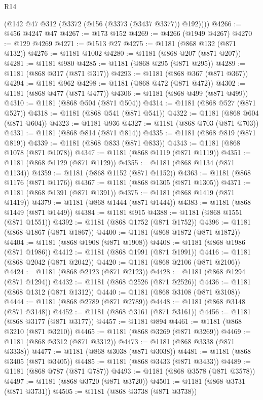 \begin{lexlean}{R14}
\begin{coremodule}
      (@142 @47 @312 (@3372 (@156 (@3373 (@3437 @3377)) @192))))
@4266 := @456 @4247 @47
@4267 := @173 @152
@4269 := @4266 (@1949 @4267)
@4270 := @129 @4269
@4271 := @1513 @27
@4275 := @1181 (@868 @132 (@871 @132))
@4276 := @1181 @1002
@4280 := @1181 (@868 @207 (@871 @207))
@4281 := @1181 @980
@4285 := @1181 (@868 @295 (@871 @295))
@4289 := @1181 (@868 @317 (@871 @317))
@4293 := @1181 (@868 @367 (@871 @367))
@4294 := @1181 @962
@4298 := @1181 (@868 @472 (@871 @472))
@4302 := @1181 (@868 @477 (@871 @477))
@4306 := @1181 (@868 @499 (@871 @499))
@4310 := @1181 (@868 @504 (@871 @504))
@4314 := @1181 (@868 @527 (@871 @527))
@4318 := @1181 (@868 @541 (@871 @541))
@4322 := @1181 (@868 @604 (@871 @604))
@4323 := @1181 @936
@4327 := @1181 (@868 @703 (@871 @703))
@4331 := @1181 (@868 @814 (@871 @814))
@4335 := @1181 (@868 @819 (@871 @819))
@4339 := @1181 (@868 @833 (@871 @833))
@4343 := @1181 (@868 @1078 (@871 @1078))
@4347 := @1181 (@868 @1119 (@871 @1119))
@4351 := @1181 (@868 @1129 (@871 @1129))
@4355 := @1181 (@868 @1134 (@871 @1134))
@4359 := @1181 (@868 @1152 (@871 @1152))
@4363 := @1181 (@868 @1176 (@871 @1176))
@4367 := @1181 (@868 @1305 (@871 @1305))
@4371 := @1181 (@868 @1391 (@871 @1391))
@4375 := @1181 (@868 @1419 (@871 @1419))
@4379 := @1181 (@868 @1444 (@871 @1444))
@4383 := @1181 (@868 @1449 (@871 @1449))
@4384 := @1181 @915
@4388 := @1181 (@868 @1551 (@871 @1551))
@4392 := @1181 (@868 @1752 (@871 @1752))
@4396 := @1181 (@868 @1867 (@871 @1867))
@4400 := @1181 (@868 @1872 (@871 @1872))
@4404 := @1181 (@868 @1908 (@871 @1908))
@4408 := @1181 (@868 @1986 (@871 @1986))
@4412 := @1181 (@868 @1991 (@871 @1991))
@4416 := @1181 (@868 @2042 (@871 @2042))
@4420 := @1181 (@868 @2106 (@871 @2106))
@4424 := @1181 (@868 @2123 (@871 @2123))
@4428 := @1181 (@868 @1294 (@871 @1294))
@4432 := @1181 (@868 @2526 (@871 @2526))
@4436 := @1181 (@868 @1312 (@871 @1312))
@4440 := @1181 (@868 @3108 (@871 @3108))
@4444 := @1181 (@868 @2789 (@871 @2789))
@4448 := @1181 (@868 @3148 (@871 @3148))
@4452 := @1181 (@868 @3161 (@871 @3161))
@4456 := @1181 (@868 @3177 (@871 @3177))
@4457 := @1181 @894
@4461 := @1181 (@868 @3210 (@871 @3210))
@4465 := @1181 (@868 @3269 (@871 @3269))
@4469 := @1181 (@868 @3312 (@871 @3312))
@4473 := @1181 (@868 @3338 (@871 @3338))
@4477 := @1181 (@868 @3038 (@871 @3038))
@4481 := @1181 (@868 @3405 (@871 @3405))
@4485 := @1181 (@868 @3433 (@871 @3433))
@4489 := @1181 (@868 @787 (@871 @787))
@4493 := @1181 (@868 @3578 (@871 @3578))
@4497 := @1181 (@868 @3720 (@871 @3720))
@4501 := @1181 (@868 @3731 (@871 @3731))
@4505 := @1181 (@868 @3738 (@871 @3738))

\end{coremodule}
\end{lexlean}
